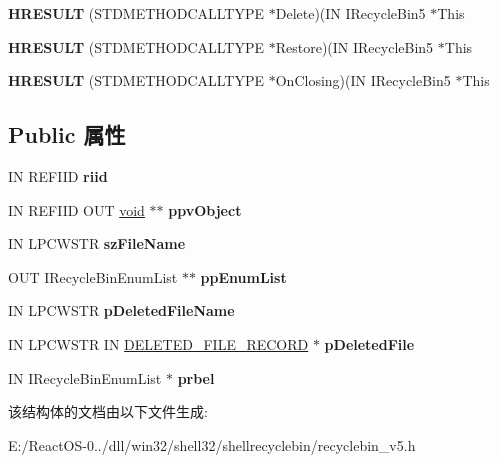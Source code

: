 \begin{DoxyCompactItemize}
\mbox{\label{struct_i_recycle_bin5_vtbl_a011fdc59708d9eabef91e0f7dcb917ab}} 
{\bfseries H\+R\+E\+S\+U\+LT} (S\+T\+D\+M\+E\+T\+H\+O\+D\+C\+A\+L\+L\+T\+Y\+PE $\ast$Delete)(IN I\+Recycle\+Bin5 $\ast$This
\item 
\mbox{\label{struct_i_recycle_bin5_vtbl_a5978dcdf54a65eac82cd29fc8eb4a1e6}} 
{\bfseries H\+R\+E\+S\+U\+LT} (S\+T\+D\+M\+E\+T\+H\+O\+D\+C\+A\+L\+L\+T\+Y\+PE $\ast$Restore)(IN I\+Recycle\+Bin5 $\ast$This
\item 
\mbox{\label{struct_i_recycle_bin5_vtbl_a148ac36dad6f97c956c8b56f1cb6dc63}} 
{\bfseries H\+R\+E\+S\+U\+LT} (S\+T\+D\+M\+E\+T\+H\+O\+D\+C\+A\+L\+L\+T\+Y\+PE $\ast$On\+Closing)(IN I\+Recycle\+Bin5 $\ast$This
\end{DoxyCompactItemize}
\subsection*{Public 属性}
\begin{DoxyCompactItemize}
\item 
\mbox{\label{struct_i_recycle_bin5_vtbl_ab3b0365a2785a8fea929c9d3a1179cf0}} 
IN R\+E\+F\+I\+ID {\bfseries riid}
\item 
\mbox{\label{struct_i_recycle_bin5_vtbl_a687196375fe6f2c59953d3de770053f7}} 
IN R\+E\+F\+I\+ID O\+UT \hyperlink{interfacevoid}{void} $\ast$$\ast$ {\bfseries ppv\+Object}
\item 
\mbox{\label{struct_i_recycle_bin5_vtbl_a8539d393a2e5e5aa38e90eb2ff7f45bf}} 
IN L\+P\+C\+W\+S\+TR {\bfseries sz\+File\+Name}
\item 
\mbox{\label{struct_i_recycle_bin5_vtbl_a13025160dcb29fc19c8c996f3fd26cb8}} 
O\+UT I\+Recycle\+Bin\+Enum\+List $\ast$$\ast$ {\bfseries pp\+Enum\+List}
\item 
\mbox{\label{struct_i_recycle_bin5_vtbl_aa8d6b37588a3378aa5196f0cce36a295}} 
IN L\+P\+C\+W\+S\+TR {\bfseries p\+Deleted\+File\+Name}
\item 
\mbox{\label{struct_i_recycle_bin5_vtbl_afde4646b10b5e8970bd02a181b3bc79d}} 
IN L\+P\+C\+W\+S\+TR IN \hyperlink{struct___d_e_l_e_t_e_d___f_i_l_e___r_e_c_o_r_d}{D\+E\+L\+E\+T\+E\+D\+\_\+\+F\+I\+L\+E\+\_\+\+R\+E\+C\+O\+RD} $\ast$ {\bfseries p\+Deleted\+File}
\item 
\mbox{\label{struct_i_recycle_bin5_vtbl_aac927f189cf1a0b6b846afecb970dfc1}} 
IN I\+Recycle\+Bin\+Enum\+List $\ast$ {\bfseries prbel}
\end{DoxyCompactItemize}


该结构体的文档由以下文件生成\+:\begin{DoxyCompactItemize}
\item 
E\+:/\+React\+O\+S-\/0../dll/win32/shell32/shellrecyclebin/recyclebin\+\_\+v5.\+h\end{DoxyCompactItemize}
